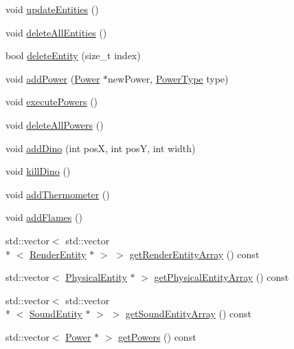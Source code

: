 \begin{DoxyCompactItemize}
void \hyperlink{class_symp_1_1_entity_manager_a9af185fe976d1c84b9e7ab1e2a4b4308}{update\-Entities} ()
\item 
void \hyperlink{class_symp_1_1_entity_manager_aa8823bae832700af54b49e8efe2a8f62}{delete\-All\-Entities} ()
\item 
bool \hyperlink{class_symp_1_1_entity_manager_acbecbcfc80353128a8c752887749c668}{delete\-Entity} (size\-\_\-t index)
\item 
void \hyperlink{class_symp_1_1_entity_manager_a3568cd6b5038905fa338eeeb37021529}{add\-Power} (\hyperlink{class_symp_1_1_power}{Power} $\ast$new\-Power, \hyperlink{namespace_symp_a81b2b15da470e4ace7de6835ebe0f8ba}{Power\-Type} type)
\item 
void \hyperlink{class_symp_1_1_entity_manager_a4c10b6b3f729b60049514a2d96e29270}{execute\-Powers} ()
\item 
void \hyperlink{class_symp_1_1_entity_manager_a06a96fd5af27e6b6eb1b1c2e67345998}{delete\-All\-Powers} ()
\item 
void \hyperlink{class_symp_1_1_entity_manager_a9fa151de7f5145f6990f1ca45aa9fa19}{add\-Dino} (int pos\-X, int pos\-Y, int width)
\item 
void \hyperlink{class_symp_1_1_entity_manager_a7d3e685f1e29720b75d5206d0b96fffb}{kill\-Dino} ()
\item 
void \hyperlink{class_symp_1_1_entity_manager_a233cc9e9f348ac0e8c6818597e58cdbf}{add\-Thermometer} ()
\item 
void \hyperlink{class_symp_1_1_entity_manager_ae1b3fd03c8a01486df734a157c85609f}{add\-Flames} ()
\item 
std\-::vector$<$ std\-::vector\\*
$<$ \hyperlink{class_symp_1_1_render_entity}{Render\-Entity} $\ast$ $>$ $>$ \hyperlink{class_symp_1_1_entity_manager_a0c0cfc745886eab36f21fd504e96eea0}{get\-Render\-Entity\-Array} () const 
\item 
std\-::vector$<$ \hyperlink{class_symp_1_1_physical_entity}{Physical\-Entity} $\ast$ $>$ \hyperlink{class_symp_1_1_entity_manager_a9dac748cf0f913f940031c3afa372dc5}{get\-Physical\-Entity\-Array} () const 
\item 
std\-::vector$<$ std\-::vector\\*
$<$ \hyperlink{class_symp_1_1_sound_entity}{Sound\-Entity} $\ast$ $>$ $>$ \hyperlink{class_symp_1_1_entity_manager_a990d6ecd90a1f69745113bde6ca0f7ce}{get\-Sound\-Entity\-Array} () const 
\item 
std\-::vector$<$ \hyperlink{class_symp_1_1_power}{Power} $\ast$ $>$ \hyperlink{class_symp_1_1_entity_manager_a17a315620fcf4158f8d4d897493ad531}{get\-Powers} () const 

\end{DoxyCompactItemize}
